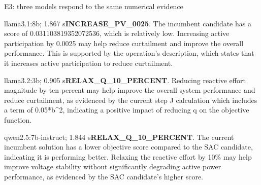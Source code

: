 \begin{frame}[t]{E3: three models respond to the same numerical evidence}
\deepdive
{}
\begin{block}{llama3.1:8b; 1.867 s}\fontsize{7.3}{8.3}\selectfont \textbf{INCREASE\_PV\_0025}. The incumbent candidate has a score of 0.031103819352072536, which is relatively low. Increasing active participation by 0.0025 may help reduce curtailment and improve the overall performance. This is supported by the operation's description, which states that it increases active participation to reduce curtailment.
\end{block}
\begin{block}{llama3.2:3b; 0.905 s}\fontsize{7.3}{8.3}\selectfont \textbf{RELAX\_Q\_10\_PERCENT}. Reducing reactive effort magnitude by ten percent may help improve the overall system performance and reduce curtailment, as evidenced by the current step J calculation which includes a term of 0.05*b\textasciicircum{}2, indicating a positive impact of reducing q on the objective function.
\end{block}
\begin{block}{qwen2.5:7b-instruct; 1.844 s}\fontsize{7.3}{8.3}\selectfont \textbf{RELAX\_Q\_10\_PERCENT}. The current incumbent solution has a lower objective score compared to the SAC candidate, indicating it is performing better. Relaxing the reactive effort by 10\% may help improve voltage stability without significantly degrading active power performance, as evidenced by the SAC candidate's higher score.
\end{block}

\end{frame}

